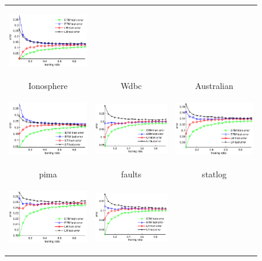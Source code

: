 \documentclass{article} %
\begin{document}
\begin{figure}[t]
\begin{tabular}{ccc}
        \includegraphics[width=44mm,height=30mm]{Australian.eps} \\
        Ionosphere &
        Wdbc &
        Australian \\
        \includegraphics[width=44mm,height=30mm]{pima.eps} &
        \includegraphics[width=44mm,height=30mm]{faults.eps} &
        \includegraphics[width=44mm,height=30mm]{statlog.eps} \\
        pima &
        faults &
        statlog \\
        \includegraphics[width=44mm,height=30mm]{wine.eps} &
        \includegraphics[width=44mm,height=30mm]{waveform.eps} &

\end{tabular}
\end{figure}
\end{document}
